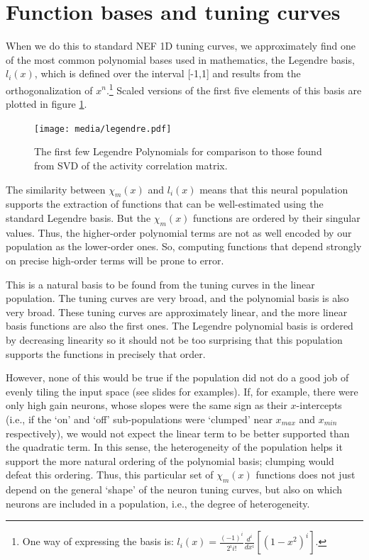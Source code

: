 \documentclass[10pt,letterpaper,oneside]{article}
\begin{document}
\section{Function bases and tuning curves}

When we do this to standard NEF 1D tuning curves, we approximately find one of the most common polynomial bases
used in mathematics, the Legendre basis,
$l_{i}(x)$, which is defined over the interval {[}-1,1{]} and results
from the orthogonalization of $x^{n}$.\footnote{One way of expressing the basis is: $l_{i}(x)=\frac{(-1)^{i}}{2^{i}i!}\frac{d^{i}}{dx^{i}}\left[\left(1-x^{2}\right)^{i}\right]$.}
Scaled versions of the first five elements of this basis are plotted
in figure \ref{c5.fig.broad.chi}. 

\begin{figure}[t]
  \centering
  \texttt{[image: media/legendre.pdf]}
  \caption{The first few Legendre Polynomials for comparison to those found from SVD of the activity correlation matrix.}
	\label{c5.fig.broad.chi}
\end{figure}

The similarity between $\chi_{m}(x)$ and $l_{i}(x)$ means that this
neural population supports the extraction of functions that can be
well-estimated using the standard Legendre basis. But the $\chi_{m}(x)$
functions are ordered by their singular values. Thus, the higher-order
polynomial terms are not as well encoded by our population as the
lower-order ones. So, computing functions that depend strongly on
precise high-order terms will be prone to error.

This is a natural basis to be found from the tuning curves in the
linear population. The tuning curves are very broad, and the polynomial
basis is also very broad. These tuning curves are approximately linear,
and the more linear basis functions are also the first ones. The Legendre
polynomial basis is ordered by decreasing linearity so it should not
be too surprising that this population supports the functions in precisely
that order. 

However, none of this would be true if the population did not do a
good job of evenly tiling the input space (see slides for examples). If, for example, there
were only high gain neurons, whose slopes were the same sign as their
$x$-intercepts (i.e., if the `on' and `off' sub-populations were
`clumped' near $x_{max}$ and $x_{min}$ respectively), we would not
expect the linear term to be better supported than the quadratic term.
In this sense, the heterogeneity of the population helps it support
the more natural ordering of the polynomial basis; clumping would
defeat this ordering. Thus, this particular set of $\chi_{m}(x)$
functions does not just depend on the general `shape' of the neuron
tuning curves, but also on which neurons are included in a population,
i.e., the degree of heterogeneity.
\end{document}
